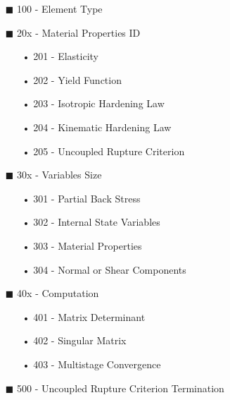 \documentclass[11pt,a4paper,twoside,final,onecolumn,titlepage]{article}
\begin{document}
\begin{itemize}
	\item[\tiny$\blacksquare$] 100 - Element Type
	\item[\tiny$\blacksquare$] 20x - Material Properties ID
    \begin{itemize}
		\item[•] 201 - Elasticity
		\item[•] 202 - Yield Function
		\item[•] 203 - Isotropic Hardening Law
		\item[•] 204 - Kinematic Hardening Law
		\item[•] 205 - Uncoupled Rupture Criterion
    \end{itemize}
	\item[\tiny$\blacksquare$] 30x - Variables Size
    \begin{itemize}
		\item[•] 301 - Partial Back Stress
		\item[•] 302 - Internal State Variables
		\item[•] 303 - Material Properties
		\item[•] 304 - Normal or Shear Components
    \end{itemize}
	\item[\tiny$\blacksquare$] 40x - Computation
    \begin{itemize}
		\item[•] 401 - Matrix Determinant
		\item[•] 402 - Singular Matrix
		\item[•] 403 - Multistage Convergence
    \end{itemize}
	\item[\tiny$\blacksquare$] 500 - Uncoupled Rupture Criterion Termination
\end{itemize}
\end{document}
